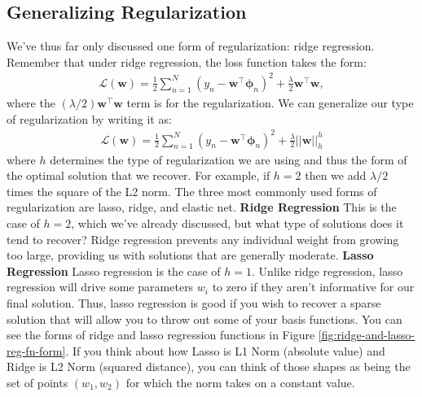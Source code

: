 \subsection{Generalizing Regularization}
We've thus far only discussed one form of regularization: ridge regression. Remember that under ridge regression, the loss function takes the form:
\begin{align*}
    \mathcal{L}(\textbf{w}) = \frac{1}{2} \sum_{n=1}^{N} (y_{n} - \textbf{w}^\top\boldsymbol{\phi}_{n})^2 + \frac{\lambda}{2}\textbf{w}^{\top}\textbf{w},
\end{align*}
%
where the $(\lambda/2)\textbf{w}^\top\textbf{w}$ term is for the regularization. We can generalize our type of regularization by writing it as:
\begin{align*}
    \mathcal{L}(\textbf{w}) = \frac{1}{2} \sum_{n=1}^{N} (y_{n} - \textbf{w}^\top\boldsymbol{\phi}_{n})^2 + \frac{\lambda}{2}\big|\big|\textbf{w}\big|\big|_h^{h}
\end{align*}
where $h$ determines the type of regularization we are using and thus the form of the optimal solution that we recover. For example, if $h=2$ then we add $\lambda/2$ times the square of the L2 norm.
The three most commonly used forms of regularization are lasso, ridge, and elastic net. \newline \newline
\textbf{Ridge Regression} \newline
This is the case of $h = 2$, which we've already discussed, but what type of solutions does it tend to recover? Ridge regression prevents any individual weight from growing too large, providing us with solutions that are generally moderate. \newline \newline
\textbf{Lasso Regression} \newline
Lasso regression is the case of $h = 1$. Unlike ridge regression, lasso regression will drive some parameters $w_{i}$ to zero if they aren't informative for our final solution. Thus, lasso regression is good if you wish to recover a sparse solution that will allow you to throw out some of your basis functions. You can see the forms of ridge and lasso regression functions in Figure \ref{fig:ridge-and-lasso-reg-fn-form}.
If you think about how Lasso is L1 Norm (absolute value) and Ridge is L2 Norm (squared distance), you can think of those shapes as being the set of points $(w_1,w_2)$ for which the norm takes on a constant value.
%
\newline
\newline

